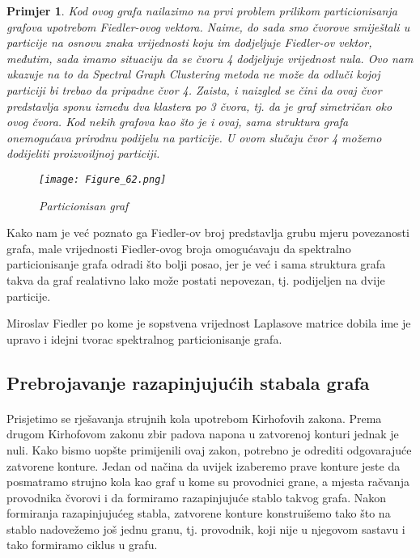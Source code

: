 \documentclass[11pt]{article}
\newtheorem{example}{Primjer}
\begin{document}
\begin{example}
		Kod ovog grafa nailazimo na prvi problem prilikom particionisanja grafova upotrebom Fiedler-ovog vektora. 
		Naime, do sada smo čvorove smiještali u particije na osnovu znaka vrijednosti koju im dodjeljuje Fiedler-ov vektor, međutim, sada imamo situaciju da se čvoru 4 dodjeljuje vrijednost nula.
		Ovo nam ukazuje na to da Spectral Graph Clustering metoda ne može da odluči kojoj particiji bi trebao da pripadne čvor 4.
		Zaista, i naizgled se čini da ovaj čvor predstavlja sponu između dva klastera po 3 čvora, tj. da je graf simetričan oko ovog čvora.
		Kod nekih grafova kao što je i ovaj, sama struktura grafa onemogućava prirodnu podijelu na particije.
		U ovom slučaju čvor 4 možemo dodijeliti proizvoiljnoj particiji. 
		
		\begin{figure}[h]
			\centering
			\texttt{[image: Figure\_62.png]}
			\caption{Particionisan graf}
		\end{figure}
	\end{example}

	Kako nam je već poznato ga Fiedler-ov broj predstavlja grubu mjeru povezanosti grafa,
	male vrijednosti Fiedler-ovog broja omogućavaju da spektralno particionisanje grafa odradi što bolji posao,
	jer je već i sama struktura grafa takva da graf realativno lako može postati nepovezan, tj. podijeljen na dvije particije.

	Miroslav Fiedler po kome je sopstvena vrijednost Laplasove matrice dobila ime je upravo i idejni tvorac spektralnog particionisanje grafa.

	\subsection{Prebrojavanje razapinjujućih stabala grafa}
	
		\paragraph{}
		Prisjetimo se rješavanja strujnih kola upotrebom Kirhofovih zakona. Prema drugom Kirhofovom zakonu zbir padova napona u zatvorenoj konturi jednak je nuli. 
		Kako bismo uopšte primijenili ovaj zakon, potrebno je odrediti odgovarajuće zatvorene konture.
		Jedan od načina da uvijek izaberemo prave konture jeste da posmatramo strujno kola kao graf u kome su provodnici grane, 
		a mjesta račvanja provodnika čvorovi i da formiramo razapinjujuće stablo takvog grafa.
		Nakon formiranja razapinjujućeg stabla, zatvorene konture konstruišemo tako što na stablo nadovežemo još jednu granu,
	    tj. provodnik, koji nije u njegovom sastavu i tako formiramo ciklus u grafu.
	
\end{document}
